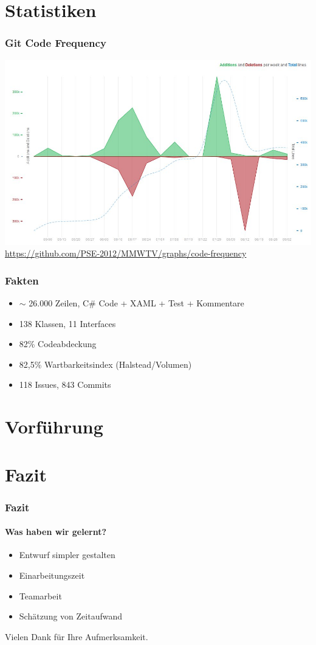 \documentclass[t]{beamer}
\begin{document}
\section{Statistiken}
\begin{frame}
	\frametitle{Git Code Frequency}
	\includegraphics[scale=.33]{img/GitCodeFrequency.jpg}\\
	\hyperlink{Git Code Frequency}{https://github.com/PSE-2012/MMWTV/graphs/code-frequency}
\end{frame}
\begin{frame}
	\frametitle{Fakten}
	\begin{itemize}
	\item <+-> \begin{math}\sim\end{math} 26.000 Zeilen, C\# Code + XAML + Test + Kommentare
	\item <+-> 138 Klassen, 11 Interfaces
	\item <+-> 82\% Codeabdeckung
	\item <+-> 82,5\% Wartbarkeitsindex (Halstead/Volumen)
	\item <+-> 118 Issues, 843 Commits 
	\end{itemize}
\end{frame}
\section{Vorführung}
\section{Fazit}
\begin{frame}
	\frametitle{Fazit}
	\framesubtitle{Was haben wir gelernt?}
	\begin{itemize}
	\itemsep1em
	\item <+-> Entwurf simpler gestalten
	\item <+-> Einarbeitungszeit
	\item <+-> Teamarbeit
	\item <+-> Schätzung von Zeitaufwand
	\end{itemize}
\end{frame}
\begin{frame}[c]
	Vielen Dank für Ihre Aufmerksamkeit.
\end{frame}
\end{document}
